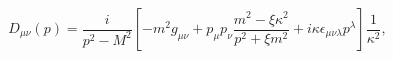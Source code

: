 \begin{equation}
D_{\mu \nu} (p) = \frac{i}{p^2-M^2} \left[ -m^2 g_{\mu \nu}
+ p_{\mu} p_{\nu} \frac{m^2 - \xi \kappa^2}{p^2 + \xi m^2} + i
\kappa \epsilon_{\mu \nu \lambda} p^{\lambda} \right]\frac{1}{\kappa^2} ,
\end{equation}

